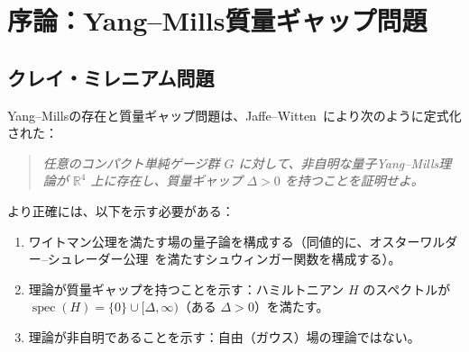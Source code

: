 \documentclass[12pt]{article}
\theoremstyle{plain}
\theoremstyle{definition}
\numberwithin{equation}{section}
\newcommand{\R}{\mathbb{R}}
\newcommand{\spec}{\operatorname{spec}}
\newcommand{\pr}{\mathrm{pr}}
\newcommand{\loc}{\mathrm{loc}}
\newcommand{\ov}{\mathrm{ov}}
\newcommand{\tr}{\mathrm{tr}}
\begin{document}
\begin{titlepage}
\begin{abstract}
\textbf{第IV段階}（降下）。
主ギャップは有界カレント比較を介して物理的転送作用素に転送され、一様な有限カットオフ・ポアンカレ不等式を与える。連続極限はギャップを保存し、
\[
\spec(H_G)\cap(0,\Delta_G)=\varnothing,
\qquad
\Delta_G=\frac{2\mu_{\loc}}{\Lambda_{\pr}M_{\tr}^2\nu_{\ov}}\cdot M_G\min(\delta_G,1)>0
\]
を得る。
本証明が外部入力として使用するのは、オスターワルダー--シュレーダー再構成定理、ブラスカンプ--リーブ共分散不等式、およびウィルソン格子ゲージ理論の反射正値性のみである。
\end{abstract}
\end{titlepage}

\setcounter{page}{1}
\tableofcontents
\newpage


\section*{序論：Yang--Mills質量ギャップ問題}

\subsection*{クレイ・ミレニアム問題}

Yang--Millsの存在と質量ギャップ問題は、Jaffe--Witten~\cite{JaffeWitten}により次のように定式化された：

\begin{quote}
\emph{任意のコンパクト単純ゲージ群 $G$ に対して、非自明な量子Yang--Mills理論が $\R^4$ 上に存在し、質量ギャップ $\Delta>0$ を持つことを証明せよ。}
\end{quote}

より正確には、以下を示す必要がある：
\begin{enumerate}[label=(\roman*)]
\item ワイトマン公理を満たす場の量子論を構成する（同値的に、オスターワルダー--シュレーダー公理~\cite{OsterwalderSchrader}を満たすシュウィンガー関数を構成する）。
\item 理論が質量ギャップを持つことを示す：ハミルトニアン $H$ のスペクトルが $\spec(H)=\{0\}\cup[\Delta,\infty)$（ある $\Delta>0$）を満たす。
\item 理論が非自明であることを示す：自由（ガウス）場の理論ではない。
\end{enumerate}
\end{document}
